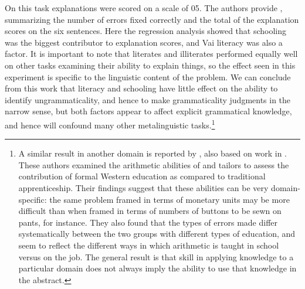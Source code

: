 \noindent
On this task explanations were scored on a scale of 0\textendash{}5. The authors provide , summarizing the number of errors fixed correctly and the total of the explanation scores on the six sentences. Here the regression analysis showed that schooling was the biggest contributor to explanation scores, and Vai literacy was also a factor. It is important to note that literates and illiterates performed equally well on other tasks examining their ability to explain things, so the effect seen in this experiment is specific to the linguistic content of the problem. We can conclude from this work that literacy and schooling have little effect on the ability to identify ungrammaticality, and hence to make grammaticality judgments in the narrow sense, but both factors appear to affect explicit grammatical knowledge, and hence will confound many other metalinguistic tasks.\footnote{A similar result in another domain is reported by \citet{ReedEtAl1979}, also based on work in . These authors examined the arithmetic abilities of  and  tailors to assess the contribution of formal Western education as compared to traditional apprenticeship. Their findings suggest that these abilities can be very domain-specific: the same problem framed in terms of monetary units may be more difficult than when framed in terms of numbers of buttons to be sewn on pants, for instance. They also found that the types of errors made differ systematically between the two groups with different types of education, and seem to reflect the different ways in which arithmetic is taught in school versus on the job. The general result is that skill in applying knowledge to a particular domain does not always imply the ability to use that knowledge in the abstract.}

\begin{table}
\caption{Comparison of Vai Error Correction and Explanation as a Function of Literacy \citep{ScribnerEtAl1981}}
\label{tab:2}

\end{table}

